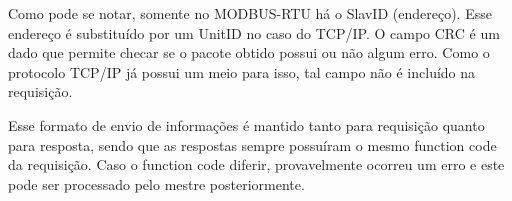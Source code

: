 Como pode se notar, somente no MODBUS-RTU há o SlavID (endereço). Esse endereço é substituído por um UnitID no caso do TCP/IP. O campo CRC é um dado que permite checar se o pacote obtido possui ou não algum erro. Como o protocolo TCP/IP já possui um meio para isso, tal campo não é incluído na requisição.

Esse formato de envio de informações é mantido tanto para requisição quanto para resposta, sendo que as respostas sempre possuíram o mesmo function code da requisição. Caso o function code diferir, provavelmente ocorreu um erro e este pode ser processado pelo mestre posteriormente.
